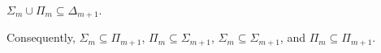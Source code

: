 $\Sigma_m \cup \Pi_m \subseteq \Delta_{m+1}$.

Consequently, $\Sigma_m \subseteq \Pi_{m+1}$, $\Pi_m \subseteq \Sigma_{m+1}$, $\Sigma_m \subseteq \Sigma_{m+1}$, and $\Pi_m \subseteq \Pi_{m+1}$.

